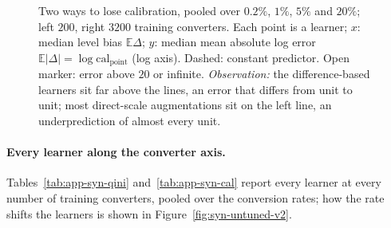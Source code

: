 \documentclass{article}
\begin{document}
\begin{figure}[H]
\centering
{}
\caption{Two ways to lose calibration, pooled over $0.2\%$, $1\%$, $5\%$ and $20\%$;
left $200$, right $3200$ training converters. Each point is a learner; $x$:
median level bias $\mathbb{E}\Delta$; $y$: median mean absolute log error
$\mathbb{E}|\Delta| = \log\mathrm{cal}_\text{point}$ (log axis). Dashed:
constant predictor. Open marker: error above $20$ or infinite.
\emph{Observation:} the difference-based learners sit far above the lines,
an error that differs from unit to unit; most direct-scale augmentations sit
on the left line, an underprediction of almost every unit.}
\label{fig:syn-bias-v2}
\end{figure}

\paragraph{Every learner along the converter axis.}
Tables~\ref{tab:app-syn-qini} and~\ref{tab:app-syn-cal} report every learner
at every number of training converters, pooled over the conversion rates; how
the rate shifts the learners is shown in Figure~\ref{fig:syn-untuned-v2}.
\end{document}
